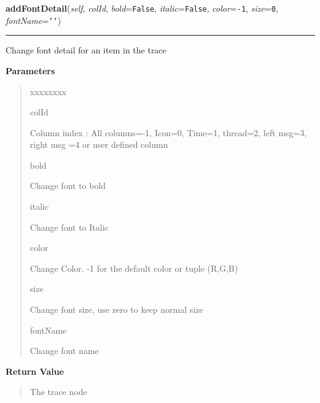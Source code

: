 \hspace{.8\funcindent}\begin{boxedminipage}{\funcwidth}

    \raggedright \textbf{addFontDetail}(\textit{self}, \textit{colId}, \textit{bold}={\tt False}, \textit{italic}={\tt False}, \textit{color}={\tt -1}, \textit{size}={\tt 0}, \textit{fontName}={\tt \texttt{'}\texttt{}\texttt{'}})

    \vspace{-1.5ex}

    \rule{\textwidth}{0.5\fboxrule}
\setlength{\parskip}{2ex}
    Change font detail for an item in the trace

\setlength{\parskip}{1ex}
      \textbf{Parameters}
      \vspace{-1ex}

      \begin{quote}
        \begin{Ventry}{xxxxxxxx}

          \item[colId]

          Column index : All columns=-1, Icon=0, Time=1, thread=2, left 
          msg=3, right msg =4 or user defined column

          \item[bold]

          Change font to bold

          \item[italic]

          Change font to Italic

          \item[color]

          Change Color. -1 for the default color or tuple (R,G,B)

          \item[size]

          Change font size, use zero to keep normal size

          \item[fontName]

          Change font name

        \end{Ventry}

      \end{quote}

      \textbf{Return Value}
    \vspace{-1ex}

      \begin{quote}
      The trace node

      \end{quote}

    \end{boxedminipage}


